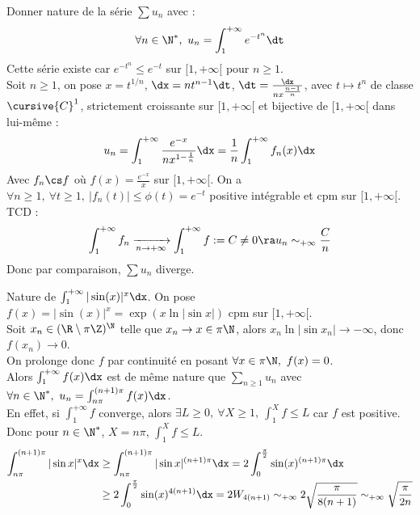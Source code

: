 \documentclass[11pt]{article}
\begin{document}
\begin{exercice}{}{}
    Donner nature de la série $\sum u_n$ avec :
    \begin{equation*}
        \forall n \in \N^*, ~ u_n = \int_1^{+\infty}e^{-t^n}\dt 
    \end{equation*}
    \tcblower
    Cette série existe car $e^{-t^n} \leq e^{-t}$ sur $[1,+\infty[$ pour $n\geq1$.\\
    Soit $n\geq1$, on pose $x=t^{1/n}$, $\dx=nt^{n-1}\dt$, $\dt=\frac{\dx}{nx^\frac{n-1}{n}}$, avec $t\mapsto t^n$ de classe $\cursive{C}^1$, strictement croissante sur $[1,+\infty[$ et bijective de $[1,+\infty[$ dans lui-même :
    \begin{equation*}
        u_n = \int_1^{+\infty}\frac{e^{-x}}{nx^{1-\frac{1}{n}}}\dx = \frac{1}{n}\int_1^{+\infty}f_n(x)\dx
    \end{equation*}
    Avec $f_n\cs f$ où $f(x)=\frac{e^{-x}}{x}$ sur $[1,+\infty[$. On a $\forall n \geq 1, ~ \forall t \geq 1, ~ |f_n(t)|\leq\phi(t)=e^{-t}$ positive intégrable et cpm sur $[1,+\infty[$. TCD :
    \begin{equation*}
        \int_1^{+\infty}f_n \xrightarrow[n\to+\infty]{} \int_1^{+\infty}f := C\neq0 \ra u_n \sim_{+\infty}\frac{C}{n}
    \end{equation*}
    Donc par comparaison, $\sum u_n$ diverge.
\end{exercice}

\begin{exercice}{}{}
    Nature de $\int_1^{+\infty}|\sin(x)|^x\dx$.
    \tcblower
    On pose $f(x)=|\sin(x)|^x=\exp(x\ln|\sin x|)$ cpm sur $[1,+\infty[$.\\
    Soit $x_n \in (\R\setminus \pi\Z)^\N$ telle que $x_n\to x \in \pi\N$, alors $x_n\ln|\sin x_n|\to-\infty$, donc $f(x_n)\to0$.\\
    On prolonge donc $f$ par continuité en posant $\forall x \in \pi\N, ~ f(x)=0$.\\
    Alors $\int_1^{+\infty}f(x)\dx$ est de même nature que $\sum_{n\geq1}u_n$ avec $\forall n \in \N^*, ~ u_n= \int_{n\pi}^{(n+1)\pi}f(x)\dx$.\\
    En effet, si $\int_1^{+\infty} f$ converge, alors $\exists L \geq 0, ~ \forall X \geq 1, ~ \int_1^Xf \leq L$ car $f$ est positive.\\
    Donc pour $n\in\N^*$, $X=n\pi$, $\int_1^Xf\leq L$.
    \begin{align*}
        \int_{n\pi}^{(n+1)\pi}|\sin x|^x\dx &\geq \int_{n\pi}^{(n+1)\pi}|\sin x|^{(n+1)\pi}\dx = 2\int_0^{\frac{\pi}{2}}\sin(x)^{(n+1)\pi}\dx\\&\geq2\int_0^{\frac{\pi}{2}}\sin(x)^{4(n+1)}\dx=2W_{4(n+1)}\sim_{+\infty}2\sqrt{\frac{\pi}{8(n+1)}}\sim_{+\infty}\sqrt{\frac{\pi}{2n}}
    \end{align*}
\end{exercice}
\end{document}

